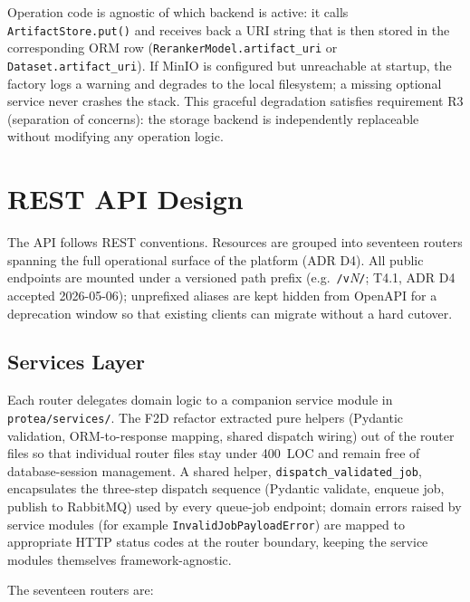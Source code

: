 Operation code is agnostic of which backend is active: it calls
\texttt{ArtifactStore.put()} and receives back a URI string that is then stored
in the corresponding ORM row (\texttt{RerankerModel.artifact\_uri} or
\texttt{Dataset.artifact\_uri}). If MinIO is configured but unreachable at
startup, the factory logs a warning and degrades to the local filesystem; a
missing optional service never crashes the stack. This graceful degradation
satisfies requirement R3 (separation of concerns): the storage backend is
independently replaceable without modifying any operation logic.

\section{REST API Design}
\label{sec:api-design}

The API follows REST conventions. Resources are grouped into seventeen routers
spanning the full operational surface of the platform (ADR D4). All public
endpoints are mounted under a versioned path prefix (e.g.\ \texttt{/v}\emph{N}\texttt{/};
T4.1, ADR D4 accepted 2026-05-06); unprefixed aliases are kept hidden from
OpenAPI for a deprecation window so that existing clients can migrate without a
hard cutover.

\subsection{Services Layer}
\label{subsec:services-layer}

Each router delegates domain logic to a companion service module in
\texttt{protea/services/}. The F2D refactor extracted pure helpers (Pydantic
validation, ORM-to-response mapping, shared dispatch wiring) out of the router
files so that individual router files stay under 400~LOC and remain free of
database-session management. A shared helper, \texttt{dispatch\_validated\_job},
encapsulates the three-step dispatch sequence (Pydantic validate, enqueue job,
publish to RabbitMQ) used by every queue-job endpoint; domain errors raised by
service modules (for example \texttt{InvalidJobPayloadError}) are mapped to
appropriate HTTP status codes at the router boundary, keeping the service modules
themselves framework-agnostic.

The seventeen routers are:

